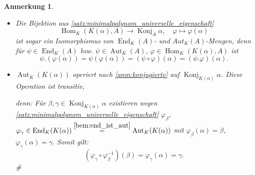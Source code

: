 \documentclass[a4paper, twoside, 11pt, ngerman]{report}
\DeclareMathOperator{\Aut}{Aut}
\DeclareMathOperator{\End}{End}
\DeclareMathOperator{\Hom}{Hom}
\DeclareMathOperator{\Konj}{Konj}
\theoremstyle{definistyle}
\newtheorem{anm}[satz]{Anmerkung}
\theoremstyle{remark}
\newenvironment{denn}%
  {\par\textit{denn:}}%
  {\hfill\#\par}
\begin{document}
\begin{anm}\label{anm:automorphismen_operation}
\begin{itemize}
\item Die Bijektion aus \ref{satz:minimalpolynom_universelle_eigenschaft}
\[
\Hom_K(K(\alpha), A) \to \Konj_A\alpha, \quad \varphi \mapsto \varphi(\alpha)
\] ist sogar ein Isomorphismus von $\End_K(A)$- und $Aut_K(A)$-Mengen, denn
für $\psi\in\End_K(A)$ bzw. $\psi\in\Aut_K(A)$, $\varphi\in\Hom_K(K(\alpha),A)$ ist
\[
\psi.(\varphi(\alpha))=\psi(\varphi(\alpha))=(\psi\circ\varphi)(\alpha)=(\psi.\varphi)(\alpha).
\]

\item $\Aut_K(K(\alpha))$ operiert nach \ref{anm:konjugierte} auf $\Konj_{K(\alpha)}\alpha$. Diese Operation ist transitiv,
\begin{denn}
Für $\beta, \gamma\in \Konj_{K(\alpha)}\alpha$ existieren
wegen \ref{satz:minimalpolynom_universelle_eigenschaft} $\varphi_\beta$, $\varphi_\gamma \in \End_K(K(\alpha)) \overset{\ref{bem:end_ist_aut}}{=} \Aut_K(K(\alpha))$ mit $\varphi_\beta(\alpha) = \beta$, $\varphi_\gamma(\alpha) = \gamma$. Somit gilt:
\[
(\varphi_\gamma \circ \varphi_\beta^{-1})(\beta) = \varphi_\gamma(\alpha) = \gamma.
\]
\end{denn}
\end{itemize}
\end{anm}
\end{document}
